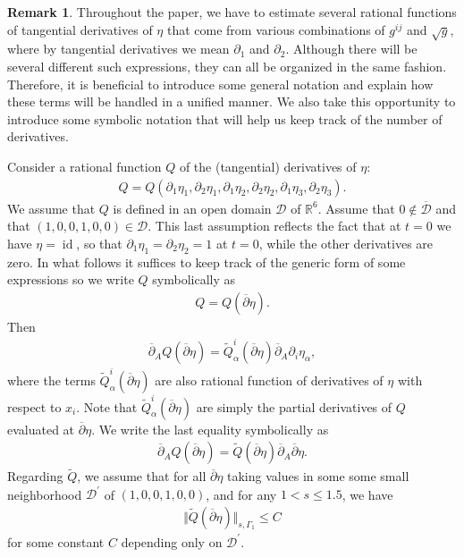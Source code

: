 \documentclass[10pt,reqno]{amsart}
\theoremstyle{plain}
\theoremstyle{definition}
\newtheorem{remark}[theorem]{Remark}
\numberwithin{equation}{section}
\newcommand{\cD}{\mathcal D}
\newcommand{\al}{\alpha}
\newcommand{\Ga}{\Gamma}
\newcommand{\RR}{\mathbb R}
\newcommand{\id}{\operatorname{id}}
\newcommand{\norm}[1]{\Vert#1\Vert}
\begin{document}
\begin{remark}
\label{remark_rational}
Throughout the paper, we have to estimate several rational functions
of tangential derivatives of $\eta$ that come from various combinations of $g^{ij}$ and
$\sqrt{g}$, where by tangential derivatives we mean $\partial_1$ and
$\partial_2$. Although there will be several different such expressions,
they can all be organized in the same fashion. Therefore, it is beneficial to introduce some general
notation and explain how these terms will be handled in a unified manner. We also take this opportunity
to introduce some symbolic notation that will help us keep track of the number of derivatives.

Consider a rational function $Q$ of the (tangential) derivatives of $\eta$:
\begin{gather}
Q = Q(\partial_1 \eta_1, \partial_2 \eta_1,
\partial_1 \eta_2, \partial_2 \eta_2,
\partial_1 \eta_3, \partial_2 \eta_3).
\nonumber
\end{gather}
We assume that $Q$ is defined in an open domain $\cD$ of $\RR^6$.
Assume that $0 \notin \overline{\cD}$ and that $(1,0,0,1, 0, 0) \in \cD$. 
This last assumption reflects the fact that at $t=0$ we have $\eta = \id$, so that
$\partial_1 \eta_1 = \partial_2 \eta_2 = 1$ at $t=0$, while 
the other derivatives are zero.
In what follows it suffices to keep track of the generic form of some expressions so 
we write $Q$ symbolically as 
 \begin{gather}
 Q = Q(\overline{\partial} \eta).
 \nonumber
 \end{gather}
Then
\begin{gather}
\overline{\partial}_A Q (\overline{\partial} \eta)= \widetilde{Q}^i_{\al} (\overline{\partial} \eta)
\overline{\partial}_A \partial_i \eta_\al,
\nonumber
\end{gather}
where the terms $\widetilde{Q}^i_{\al} (\overline{\partial} \eta)$ are also 
rational function of derivatives of $\eta$ with 
respect to $x_i$. Note that
$\widetilde{Q}^i_{\al} (\overline{\partial} \eta)$
are simply the partial derivatives of $Q$ evaluated at $\overline{\partial} \eta$.
We write the last equality symbolically as
\begin{gather}
\overline{\partial}_A Q(\overline{\partial} \eta) =
\widetilde{Q}(\overline{\partial} \eta) \overline{\partial}_A \overline{\partial} \eta.
\label{partial_Q_symb}
\end{gather}
Regarding $\widetilde{Q}$, we assume that for all $\overline{\partial} \eta$ taking values
in some some small neighborhood $\cD^\prime$ 
of $(1,0,0,1,0,0)$, and for any $1 < s \leq 1.5$,
we have
\begin{align}
\norm{\widetilde{Q}(\overline{\partial} \eta)}_{s,\Ga_1} \leq C
\label{Q_sym_estimate}
\end{align}
for some constant $C$ depending only on $\cD^\prime$.


\end{remark}
\end{document}

